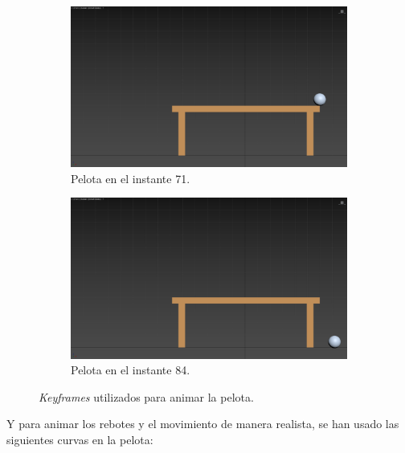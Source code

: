 \documentclass{article}
\begin{document}
\newpage
\begin{figure}[H]\ContinuedFloat
    \centering
    \begin{subfigure}[H]{0.48\textwidth}
        \centering
        \includegraphics[width=\textwidth]{imagenes/Ejercicio3/keyframes/71.png}
        \caption{Pelota en el instante 71.}
    \end{subfigure}
    \hfill
    \begin{subfigure}[H]{0.48\textwidth}
        \centering
        \includegraphics[width=\textwidth]{imagenes/Ejercicio3/keyframes/84.png}
        \caption{Pelota en el instante 84.}
    \end{subfigure}
    \caption{\textit{Keyframes} utilizados para animar la pelota.}
\end{figure}

\bigskip

Y para animar los rebotes y el movimiento de manera realista, se han usado las siguientes curvas en la pelota:
\end{document}
